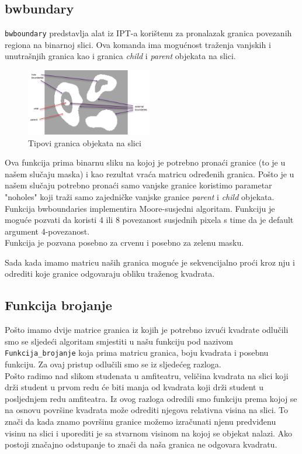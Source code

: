 \documentclass[a4paper,12pt]{article}
\begin{document}
\subsection{bwbundary}

\texttt{bwboundary} predstavlja alat iz IPT-a korištenu za pronalazak granica povezanih regiona na binarnoj slici.
Ova komanda ima mogućnost traženja vanjskih i unutrašnjih granica kao i granica \textit {child} i  \textit{parent} objekata na slici.

\begin{figure}[htbp]
    \centering
    \includegraphics[width=0.49\textwidth]{bwboundaries.png}
    \caption{Tipovi granica objekata na slici}
    \label{fig:redMaskgreenMask}
\end{figure}


Ova funkcija prima binarnu sliku na kojoj je potrebno pronaći granice (to je u našem slučaju maska) i kao rezultat vraća matricu određenih granica. 
Pošto je u našem slučaju potrebno pronaći samo vanjske granice koristimo parametar "noholes"  koji traži samo zajedničke vanjske granice \textit{parent} i \textit{child} objekata.
Funkcija bwboundaries implementira Moore-susjedni algoritam. Funkciju je moguće pozvati da koristi 4 ili 8 povezanost susjednih pixela s time da je default argument 4-povezanost.
\\
Funkcija je pozvana posebno za crvenu i posebno za zelenu masku.

Sada kada imamo matricu naših granica moguće je sekvencijalno proći kroz nju i odrediti koje granice odgovaraju obliku traženog kvadrata.

\subsection{Funkcija brojanje}



Pošto imamo dvije matrice granica iz kojih je potrebno izvući kvadrate odlučili smo se sljedeći algoritam smjestiti u našu funkciju pod nazivom \texttt{Funkcija\_brojanje} koja prima matricu granica,  boju kvadrata i posebnu funkciju.
Za ovaj pristup odlučili smo se iz sljedećeg razloga.\\
Pošto radimo nad slikom studenata u amfiteatru, veličina kvadrata na slici koji drži student u prvom redu će biti manja od kvadrata koji drži student u posljednjem redu amfiteatra. 
Iz ovog razloga odredili smo funkciju prema kojoj se na osnovu površine kvadrata može odrediti njegova relativna visina na slici. To znači da kada znamo površinu granice možemo izračunati njenu predviđenu visinu na slici i uporediti je sa stvarnom visinom na kojoj se objekat nalazi. 
Ako postoji značajno odstupanje to znači da naša granica ne odgovara kvadratu.
\\
\end{document}
